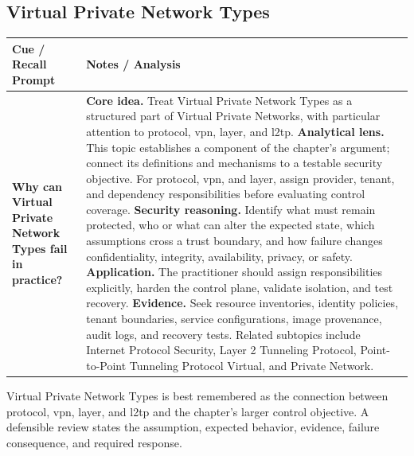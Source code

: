\documentclass[11pt]{article}
\newcommand{\CornellHeader}{%
\rowcolor{Navy}\color{white}\bfseries Cue / Recall Prompt & \color{white}\bfseries Notes / Analysis\\\hline}
\newcommand{\CornellRow}[2]{%
\cellcolor{CueGray}\RaggedRight\textbf{#1} & \RaggedRight #2\\\hline}
\begin{document}
\subsection*{Virtual Private Network Types}
\begin{longtable}{>{\RaggedRight\arraybackslash}p{}|>{\RaggedRight\arraybackslash}p{}}
\CornellHeader
\CornellRow{Why can Virtual Private Network Types fail in practice?}{\textbf{Core idea.} Treat Virtual Private Network Types as a structured part of Virtual Private Networks, with particular attention to protocol, vpn, layer, and l2tp. \textbf{Analytical lens.} This topic establishes a component of the chapter's argument; connect its definitions and mechanisms to a testable security objective. For protocol, vpn, and layer, assign provider, tenant, and dependency responsibilities before evaluating control coverage. \textbf{Security reasoning.} Identify what must remain protected, who or what can alter the expected state, which assumptions cross a trust boundary, and how failure changes confidentiality, integrity, availability, privacy, or safety. \textbf{Application.} The practitioner should assign responsibilities explicitly, harden the control plane, validate isolation, and test recovery. \textbf{Evidence.} Seek resource inventories, identity policies, tenant boundaries, service configurations, image provenance, audit logs, and recovery tests. Related subtopics include Internet Protocol Security, Layer 2 Tunneling Protocol, Point-to-Point Tunneling Protocol Virtual, and Private Network.}
\end{longtable}
\begin{topicsummary}
Virtual Private Network Types is best remembered as the connection between protocol, vpn, layer, and l2tp and the chapter's larger control objective. A defensible review states the assumption, expected behavior, evidence, failure consequence, and required response.
\end{topicsummary}
\end{document}
